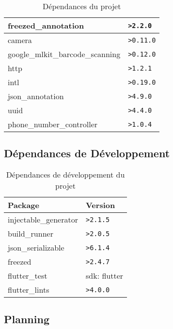 \begin{table}[h!]
\begin{tabular}{|m{}|m{}|}
        freezed\_annotation              & \texttt{>2.2.0}  \\ \hline
        camera                           & \texttt{>0.11.0} \\ \hline
        google\_mlkit\_barcode\_scanning & \texttt{>0.12.0} \\ \hline
        http                             & \texttt{>1.2.1}  \\ \hline
        intl                             & \texttt{>0.19.0} \\ \hline
        json\_annotation                 & \texttt{>4.9.0}  \\ \hline
        uuid                             & \texttt{>4.4.0}  \\ \hline
        phone\_number\_controller        & \texttt{>1.0.4}  \\ \hline
    \end{tabular}
    \caption{Dépendances du projet}
    \label{table:dependencies}
\end{table}

\subsection{Dépendances de Développement}

\begin{table}[h!]
    \centering
    \begin{tabular}{|m{}|m{}|}
        \hline
        \textbf{Package}      & \textbf{Version} \\ \hline
        injectable\_generator & \texttt{>2.1.5}  \\ \hline
        build\_runner         & \texttt{>2.0.5}  \\ \hline
        json\_serializable    & \texttt{>6.1.4}  \\ \hline
        freezed               & \texttt{>2.4.7}  \\ \hline
        flutter\_test         & sdk: flutter     \\ \hline
        flutter\_lints        & \texttt{>4.0.0}  \\ \hline
    \end{tabular}
    \caption{Dépendances de développement du projet}
    \label{table:dev-dependencies}
\end{table}

\subsection{Planning}

